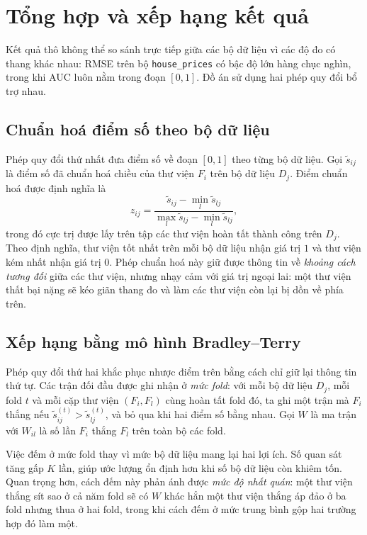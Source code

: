 \section{Tổng hợp và xếp hạng kết quả}
\label{sec:xephang}
Kết quả thô không thể so sánh trực tiếp giữa các bộ dữ liệu vì các độ đo có thang
khác nhau: RMSE trên bộ \texttt{house\_prices} có bậc độ lớn hàng chục nghìn,
trong khi AUC luôn nằm trong đoạn $[0,1]$. Đồ án sử dụng hai phép quy đổi bổ trợ
nhau.

\subsection{Chuẩn hoá điểm số theo bộ dữ liệu}
Phép quy đổi thứ nhất đưa điểm số về đoạn $[0,1]$ theo từng bộ dữ liệu. Gọi
$\tilde{s}_{ij}$ là điểm số đã chuẩn hoá chiều của thư viện $F_i$ trên bộ dữ liệu
$D_j$. Điểm chuẩn hoá được định nghĩa là
\[
    z_{ij} = \frac{\tilde{s}_{ij} - \min_{l} \tilde{s}_{lj}}
                  {\max_{l} \tilde{s}_{lj} - \min_{l} \tilde{s}_{lj}},
\]
trong đó cực trị được lấy trên tập các thư viện hoàn tất thành công trên $D_j$.
Theo định nghĩa, thư viện tốt nhất trên mỗi bộ dữ liệu nhận giá trị $1$ và thư
viện kém nhất nhận giá trị $0$. Phép chuẩn hoá này giữ được thông tin về
\emph{khoảng cách tương đối} giữa các thư viện, nhưng nhạy cảm với giá trị ngoại
lai: một thư viện thất bại nặng sẽ kéo giãn thang đo và làm các thư viện còn lại
bị dồn về phía trên.

\subsection{Xếp hạng bằng mô hình Bradley--Terry}
Phép quy đổi thứ hai khắc phục nhược điểm trên bằng cách chỉ giữ lại thông tin thứ
tự. Các trận đối đầu được ghi nhận ở \emph{mức fold}: với mỗi bộ dữ liệu $D_j$,
mỗi fold $t$ và mỗi cặp thư viện $(F_i, F_l)$ cùng hoàn tất fold đó, ta ghi một
trận mà $F_i$ thắng nếu $\tilde{s}^{(t)}_{ij} > \tilde{s}^{(t)}_{lj}$, và bỏ qua
khi hai điểm số bằng nhau. Gọi $W$ là ma trận với $W_{il}$ là số lần $F_i$ thắng
$F_l$ trên toàn bộ các fold.

Việc đếm ở mức fold thay vì mức bộ dữ liệu mang lại hai lợi ích. Số quan sát tăng
gấp $K$ lần, giúp ước lượng ổn định hơn khi số bộ dữ liệu còn khiêm tốn. Quan
trọng hơn, cách đếm này phản ánh được \emph{mức độ nhất quán}: một thư viện thắng
sít sao ở cả năm fold sẽ có $W$ khác hẳn một thư viện thắng áp đảo ở ba fold nhưng
thua ở hai fold, trong khi cách đếm ở mức trung bình gộp hai trường hợp đó làm
một.

